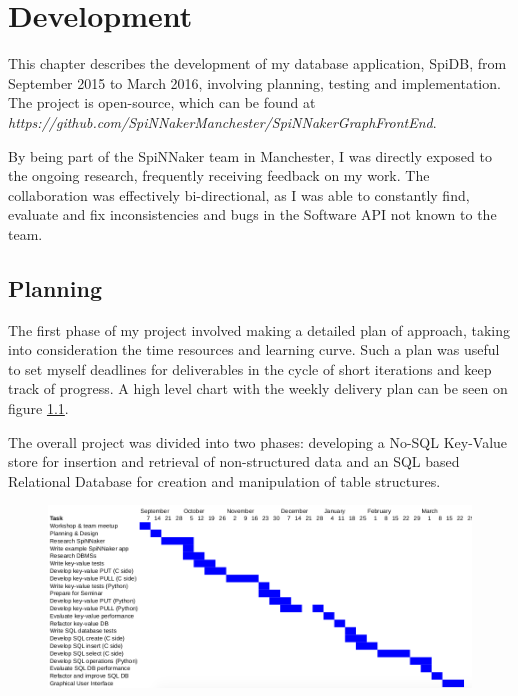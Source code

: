 \chapter{Development}

This chapter describes the development of my database application, SpiDB, from September 2015 to March 2016, involving planning, testing and implementation. The project is open-source, which can be found at
\textit{https://github.com/SpiNNakerManchester/SpiNNakerGraphFrontEnd}.

By being part of the SpiNNaker team in Manchester, I was directly exposed to the ongoing research, frequently receiving feedback on my work. The collaboration was effectively bi-directional, as I was able to constantly find, evaluate and fix inconsistencies and bugs in the Software API not known to the team.

\section{Planning}
The first phase of my project involved making a detailed plan of approach, taking into consideration the time resources and learning curve. Such a plan was useful to set myself deadlines for deliverables in the cycle of short iterations and keep track of progress. A high level chart with the weekly delivery plan can be seen on figure \ref{fig:plan}.

The overall project was divided into two phases: developing a No-SQL Key-Value store for insertion and retrieval of non-structured data and an SQL based Relational Database for creation and manipulation of table structures. 

\begin{figure}
\center
  \includegraphics[width=1.3\linewidth, natwidth=950, natheight=410]{images/plan.png}
  \label{fig:plan}
\end{figure}

